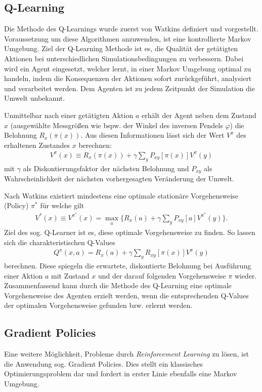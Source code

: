 	\subsection{Q-Learning}
	\label{subsec:rl_qlearning}
		Die Methode des Q-Learnings wurde zuerst von Watkins \cite{Watkins1992} definiert und vorgestellt. Voraussetzung um diese Algorithmen anzuwenden, ist eine kontrollierte Markov Umgebung. Ziel der Q-Learning Methode ist es, die Qualität der getätigten Aktionen bei unterschiedlichen Simulationsbedingungen zu verbessern. Dabei wird ein Agent eingesetzt, welcher lernt, in einer Markov Umgebung optimal zu handeln, indem die Konsequenzen der Aktionen sofort zurückgeführt, analysiert und verarbeitet werden. Dem Agenten ist zu jedem Zeitpunkt der Simulation die Umwelt unbekannt.
		
		Unmittelbar nach einer getätigten Aktion $a$ erhält der Agent neben dem Zustand $x$ (ausgewählte Messgrößen wie bspw. der Winkel des inversen Pendels $\varphi$) die Belohnung $R_x(\pi(x))$. Aus diesen Informationen lässt sich der Wert $V^\pi$ des erhaltenen Zustandes $x$ berechnen:
		\begin{align}
			V^\pi(x) \equiv R_x(\pi(x)) + \gamma \sum_{y}P_{xy}[\pi(x)]V^\pi(y)
		\end{align}
		mit $\gamma$ als Diskontierungsfaktor der nächsten Belohnung und $P_{xy}$ als Wahrscheinlichkeit der nächsten vorhergesagten Veränderung der Umwelt.
		
		Nach Watkins existiert mindestens eine optimale stationäre Vorgehensweise (\glqq Policy\grqq) $\pi^*$ für welche gilt
		\begin{align}
			V^*(x) \equiv V^{\pi^*}(x) = \max_{\substack{a}} \bigg\{R_x(a) + \gamma \sum_{y}P_{xy}[a]V^{\pi^*}(y)\bigg\}.
		\end{align}
		Ziel des sog. \glqq Q-Learner\grqq{} ist es, diese optimale Vorgehensweise zu finden. So lassen sich die charakteristischen Q-Values
		\begin{align}
			Q^\pi(x,a) = R_x(a) + \gamma \sum_{y}R_{xy}[\pi(x)]V^\pi(y)
		\end{align}
		berechnen. Diese spiegeln die erwartete, diskontierte Belohnung bei Ausführung einer Aktion $a$ mit Zustand $x$ und der darauf folgenden Vorgehensweise $\pi$ wieder. Zusammenfassend kann durch die Methode des Q-Learning eine optimale Vorgehensweise des Agenten erzielt werden, wenn die entsprechenden Q-Values der optimalen Vorgehensweise gefunden bzw. erlernt werden.
	
	\subsection{Gradient Policies}
		Eine weitere Möglichkeit, Probleme durch \textit{Reinforcement Learning} zu lösen, ist die Anwendung sog. \glqq Gradient Policies\grqq{}. Dies stellt ein klassisches Optimierungsproblem dar und fordert in erster Linie ebenfalls eine Markov Umgebung.
		
